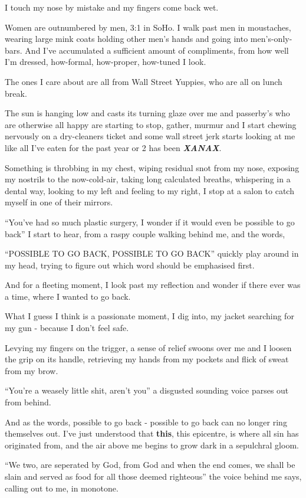 \documentclass[19pt,openany]{book}
\begin{document}
I touch my nose by mistake and
my fingers come back wet.

Women are outnumbered by men, 3:1 in SoHo.
I walk past men in moustaches, wearing large mink
coats holding other men's hands and going into
men's-only-bars. And I've accumulated a
sufficient amount of compliments, from how
well I'm dressed, how-formal, how-proper,
how-tuned I look.

The ones I care about
are all from Wall Street Yuppies, who
are all on lunch break.

The sun is hanging low and casts
its turning glaze over me and passerby's
who are otherwise all happy
are starting to stop, gather, murmur
and I start chewing nervously on a
dry-cleaners ticket and some wall street
jerk starts looking at me
like all I've eaten
for the past year or 2 has been
\textit{\textbf{XANAX}}.


Something is throbbing in my chest, wiping residual
snot from my nose, exposing
my nostrils to the now-cold-air,
taking
long calculated breaths, whispering
in a dental way, looking to my left and feeling to my right,
I stop at a salon to catch myself in one of their mirrors.

``You've had so much plastic surgery, I wonder
if it would even be possible to go back'' I start
to hear, from a raspy
couple walking behind me, and
the words,

``POSSIBLE TO GO BACK, POSSIBLE TO GO BACK''
quickly play
around in my head, trying to figure out which word
should be emphasised first.

And for a fleeting moment, I look past my reflection
and wonder if there ever was a time, where
I wanted to go back.

What I guess I think is a passionate
moment, I dig into, my jacket
searching for my gun - because I don't
feel safe.

Levying my fingers on the
trigger, a sense of relief
swoons over me and I loosen
the grip on its handle, retrieving
my hands from my pockets and flick
of sweat from my brow.

``You're a weasely little shit, aren't you'' a disgusted
sounding voice
parses out from behind.

And as the words, possible to
go back - possible to go back
can no longer ring themselves
out. I've just
understood that \textbf{this}, this
epicentre, is where all sin has originated from,
and the air above
me begins
to grow dark in a sepulchral gloom.

``We two, are seperated by
God, from God and when the end comes, we shall
be slain and served as food
for all those deemed righteous''
the voice behind me says,
calling out to me, in monotone.
\end{document}
